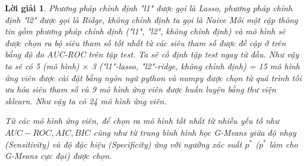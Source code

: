 \documentclass[14pt, a4paper]{article}
\theoremstyle{sltheorem}
\theoremstyle{soltheorem}
\newtheorem*{loigiai}{Lời giải}
\begin{document}
\begin{loigiai}
    Phương pháp chỉnh định "l1" được gọi là Lasso, phương pháp chỉnh định "l2" được gọi là Ridge, không chỉnh định ta gọi là Naive
    Mỗi một cặp thông tin gồm phương pháp chỉnh định ("l1", "l2", không chỉnh định) và mô hình sẽ được chọn ra bộ siêu tham số tốt nhất từ các siêu tham số được đề cập ở trên bằng độ đo AUC-ROC trên tập test.
    Ta sẽ cố định tập test ngay từ đầu.
    Như vậy ta sẽ có 5 (mô hình) $\times$ 3 ("l1"-lasso, "l2"-ridge, không chỉnh định) = 15 mô hình ứng viên được cài đặt bằng ngôn ngữ python và numpy được chọn từ quá trình tối ưu hóa siêu tham số và 9 mô hình ứng viên được huấn luyện bằng thư viện sklearn.
    Như vậy ta có 24 mô hình ứng viên.

    Từ các mô hình ứng viên, để chọn ra mô hình tốt nhất từ nhiều yếu tố như $AUC-ROC, AIC, BIC$ cũng như từ trung bình hình học G-Means giữa độ nhạy (Sensitivity) và độ đặc hiệu (Specificity) ứng với ngưỡng xác suất $p^*$ ($p^*$ làm cho G-Means cực đại) được chọn.


\end{loigiai}
\end{document}
